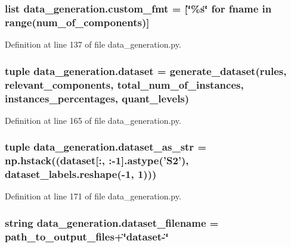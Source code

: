 \hypertarget{namespacedata__generation_a4f985887946a96aa23f5ee6af6ec33fd}{
\subsubsection[{custom\+\_\+fmt}]{\setlength{\rightskip}{0pt plus 5cm}list data\+\_\+generation.\+custom\+\_\+fmt = \mbox{[}\char`\"{}\%s\char`\"{} for fname in range({\bf num\+\_\+of\+\_\+components})\mbox{]}}}\label{namespacedata__generation_a4f985887946a96aa23f5ee6af6ec33fd}


Definition at line 137 of file data\+\_\+generation.\+py.

\hypertarget{namespacedata__generation_ad3ed025b5adf596264de6710e2b25996}{
\subsubsection[{dataset}]{\setlength{\rightskip}{0pt plus 5cm}tuple data\+\_\+generation.\+dataset = {\bf generate\+\_\+dataset}({\bf rules}, {\bf relevant\+\_\+components}, {\bf total\+\_\+num\+\_\+of\+\_\+instances}, {\bf instances\+\_\+percentages}, {\bf quant\+\_\+levels})}}\label{namespacedata__generation_ad3ed025b5adf596264de6710e2b25996}


Definition at line 165 of file data\+\_\+generation.\+py.

\hypertarget{namespacedata__generation_ad40c466460ec72a381167165d38a2c07}{
\subsubsection[{dataset\+\_\+as\+\_\+str}]{\setlength{\rightskip}{0pt plus 5cm}tuple data\+\_\+generation.\+dataset\+\_\+as\+\_\+str = np.\+hstack(({\bf dataset}\mbox{[}\+:, \+:-\/1\mbox{]}.astype('S2'), dataset\+\_\+labels.\+reshape(-\/1, 1)))}}\label{namespacedata__generation_ad40c466460ec72a381167165d38a2c07}


Definition at line 171 of file data\+\_\+generation.\+py.

\hypertarget{namespacedata__generation_a65485117b9e70dfb1f8046f6bf221338}{
\subsubsection[{dataset\+\_\+filename}]{\setlength{\rightskip}{0pt plus 5cm}string data\+\_\+generation.\+dataset\+\_\+filename = {\bf path\+\_\+to\+\_\+output\+\_\+files}+\char`\"{}dataset-\/\char`\"{}}}\label{namespacedata__generation_a65485117b9e70dfb1f8046f6bf221338}


